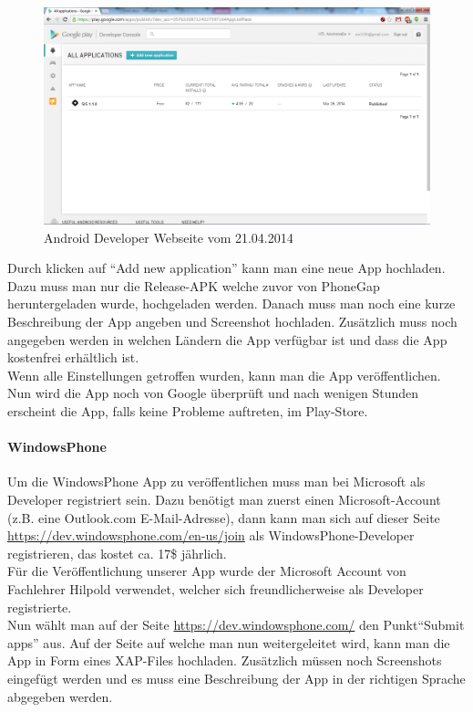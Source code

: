 \begin{figure}[H]
\includegraphics[keepaspectratio=true, width=14cm]{images/appstores/AndroidDeveloper2.png}
\caption{Android Developer Webseite vom 21.04.2014}
\end{figure}

Durch klicken auf \enquote{Add new application} kann man eine neue App hochladen. Dazu muss man nur die Release-APK welche zuvor von PhoneGap heruntergeladen wurde, hochgeladen werden. Danach muss man noch eine kurze Beschreibung der App angeben und Screenshot hochladen. Zusätzlich muss noch angegeben werden in welchen Ländern die App verfügbar ist und dass die App kostenfrei erhältlich ist.\\
Wenn alle Einstellungen getroffen wurden, kann man die App veröffentlichen. Nun wird die App noch von Google überprüft und nach wenigen Stunden erscheint die App, falls keine Probleme auftreten, im Play-Store.\\

\paragraph{WindowsPhone\\}

Um die WindowsPhone App zu veröffentlichen muss man bei Microsoft als Developer registriert sein. Dazu benötigt man zuerst einen Microsoft-Account (z.B. eine Outlook.com E-Mail-Adresse), dann kann man sich auf dieser Seite \href{https://dev.windowsphone.com/en-us/join}{https://dev.windowsphone.com/en-us/join}  als WindowsPhone-Developer registrieren, das kostet ca. 17\$ jährlich.\\
Für die Veröffentlichung unserer App wurde der Microsoft Account von Fachlehrer Hilpold verwendet, welcher sich freundlicherweise als Developer registrierte.\\
Nun wählt man auf der Seite \href{https://dev.windowsphone.com/}{https://dev.windowsphone.com/} den Punkt\enquote{Submit apps} aus. Auf der Seite auf welche man nun weitergeleitet wird, kann man die App in Form eines XAP-Files hochladen. Zusätzlich müssen noch Screenshots eingefügt werden und es muss eine Beschreibung der App in der richtigen Sprache abgegeben werden.\\

